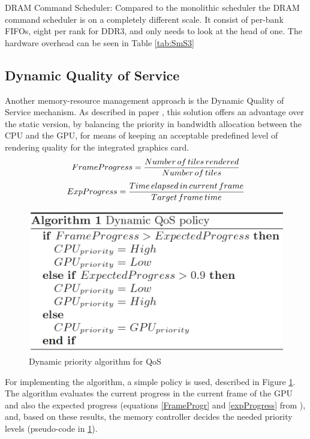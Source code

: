 \documentclass[12pt,journal,compsoc]{IEEEtran}
\begin{document}
DRAM Command Scheduler:   Compared to the monolithic scheduler the DRAM command scheduler is on a completely different scale.  It consist of per-bank FIFOs, eight per rank for DDR3, and only needs to look at the head of one. The hardware overhead can be seen in Table \ref{tab:SmS3}

\begin{table}[H]
  \centering
  \caption{Storage Overhead of Stage 3: DRAM Command Scheduler \cite{SmS}\label{tab:SmS3}}
\end{table}

\subsection{Dynamic Quality of Service}
Another memory-resource management approach is the Dynamic Quality of Service mechanism. As described in paper \cite{QoS}, this solution offers an advantage over the static version, by balancing the priority in bandwidth allocation between the CPU and the GPU, for means of keeping an acceptable predefined level of rendering quality for the integrated graphics card. 
\begin{equation}
\small{FrameProgress = \frac{Number\, of\, tiles\, rendered}{Number\, of\, tiles}}
\label{FrameProgr}
\end{equation}
\begin{equation}
\small{ExpProgress = \frac{Time\, elapsed\, in\, current\, frame}{Target\, frame\, time}}
\label{expProgress}
\end{equation}

\begin{figure}[H]
	\centering
	\includegraphics[width = 9 cm]{graphics/QoS-algorithm.PNG}
	\caption{Dynamic priority algorithm for QoS \cite{QoS} \label{QoS}}
\end{figure}
For implementing the algorithm, a simple policy is used, described in Figure \ref{QoS}. The algorithm evaluates the current progress in the current frame of the GPU and also the expected progress (equations \ref{FrameProgr} and \ref{expProgress} from \cite{QoS}), and, based on these results, the memory controller decides the needed priority levels (pseudo-code in \ref{QoS}).
\end{document}
